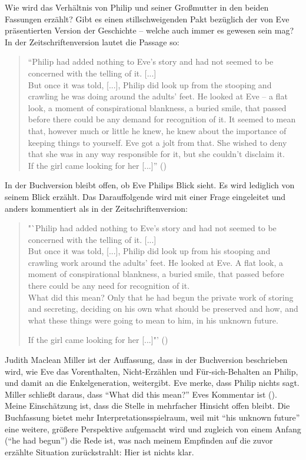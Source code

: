 \documentclass[fontsize=12pt]{scrartcl}
\begin{document}
Wie wird das Verh\"altnis von Philip und seiner Gro{\ss}mutter in den beiden Fassungen erz\"ahlt? Gibt es einen stillschweigenden Pakt bez\"uglich der von Eve pr\"asentierten Version der Geschichte -- welche auch immer es gewesen sein mag? In der Zeit\-schrif\-ten\-ver\-sion lautet die Passage so:

\singlespacing
\begin{quote}
"`Philip had added nothing to Eve's story and had not seemed to be concerned with the telling of it. [...]\\ But once it was told, [...], Philip did look up from the stooping and crawling he was doing around the adults' feet. He looked at Eve -- a flat look, a moment of conspirational blankness, a buried smile, that passed before there could be any demand for recognition of it. It seemed to mean that, however much or little he knew, he knew about the importance of keeping things to yourself. Eve got a jolt from that. She wished to deny that she was in any way responsible for it, but she couldn't disclaim it.\\
If the girl came looking for her [...]"' (\cite{Munro1998Z})
\end{quote}
\onehalfspacing

In der Buchversion bleibt offen, ob Eve Philips Blick sieht. Es wird lediglich von seinem Blick erz\"ahlt. Das Darauffolgende wird mit einer Frage eingeleitet und anders kommentiert als in der Zeitschriftenversion:

\singlespacing
\begin{quote}
"`Philip had added nothing to Eve's story and had not seemed to be concerned with the telling of it. [...]\\ But once it was told, [...], Philip did look up from his stooping and crawling work around the adults' feet. He looked at Eve. A flat look, a moment of conspirational blankness, a buried smile, that passed before there could be any need for recognition of it.\\
What did this mean? Only that he had begun the private work of storing and secreting, deciding on his own what should be preserved and how, and what these things were going to mean to him, in his unknown future.

If the girl came looking for her [...]"' (\cite{Munro1998B})
\end{quote}
\onehalfspacing

Judith Maclean Miller ist der Auffassung, dass in der Buchversion beschrieben wird, wie Eve das Vor\-enthalten, Nicht-Erz\"ahlen und F\"ur-sich-Behalten an Philip, und damit an die Enkelgeneration, weitergibt. Eve merke, dass Philip nichts sagt. Miller schlie{\ss}t daraus, dass "`What did this mean?"' Eves Kommentar ist (\cite{Miller2002}). Meine Einsch\"atzung ist, dass die Stelle in mehrfacher Hinsicht offen bleibt. Die Buchfassung bietet mehr Interpretationsspielraum, weil mit "`his unknown future"' eine weitere, gr\"o{\ss}ere Perspektive aufgemacht wird und zugleich von einem Anfang ("`he had begun"') die Rede ist, was nach meinem Empfinden auf die zuvor erz\"ahlte Situation zur\"uckstrahlt: \mbox{Hier} ist nichts klar.
\end{document}
